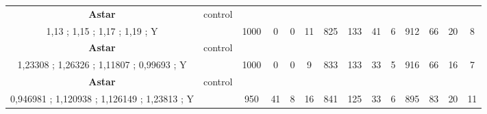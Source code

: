 \begin{table}[]
{\begin{tabular}{|c|c|c|c|c|c|c|c|c|c|c|c|c|c|}
\cellcolor{blue!15}\textbf{Astar} & control& {\color[HTML]{00009B} } & {\color[HTML]{9A0000} } & {\color[HTML]{009901} } &  & {\color[HTML]{00009B} } & {\color[HTML]{9A0000} } & {\color[HTML]{009901} } &  & {\color[HTML]{00009B} } & {\color[HTML]{9A0000} } & {\color[HTML]{009901} } &  \\ 
\cellcolor{ blue!15}1,13 ; 1,15 ; 1,17 ; 1,19 ; Y &  & \multirow{-2}{*}{{\color[HTML]{00009B} 1000}} & \multirow{-2}{*}{{\color[HTML]{9A0000} 0}} & \multirow{-2}{*}{{\color[HTML]{009901} 0}} & \multirow{-2}{*}{11} & \multirow{-2}{*}{{\color[HTML]{00009B} 825}} & \multirow{-2}{*}{{\color[HTML]{9A0000} 133}} & \multirow{-2}{*}{{\color[HTML]{009901} 41}} & \multirow{-2}{*}{6} & \multirow{-2}{*}{{\color[HTML]{00009B} 912}} & \multirow{-2}{*}{{\color[HTML]{9A0000} 66}} & \multirow{-2}{*}{{\color[HTML]{009901} 20}} & \multirow{-2}{*}{8} \\ \hline

\cellcolor{blue!15}\textbf{Astar} & control& {\color[HTML]{00009B} } & {\color[HTML]{9A0000} } & {\color[HTML]{009901} } &  & {\color[HTML]{00009B} } & {\color[HTML]{9A0000} } & {\color[HTML]{009901} } &  & {\color[HTML]{00009B} } & {\color[HTML]{9A0000} } & {\color[HTML]{009901} } &  \\ 
\cellcolor{ blue!15}1,23308 ; 1,26326 ; 1,11807 ; 0,99693 ; Y &  & \multirow{-2}{*}{{\color[HTML]{00009B} 1000}} & \multirow{-2}{*}{{\color[HTML]{9A0000} 0}} & \multirow{-2}{*}{{\color[HTML]{009901} 0}} & \multirow{-2}{*}{9} & \multirow{-2}{*}{{\color[HTML]{00009B} 833}} & \multirow{-2}{*}{{\color[HTML]{9A0000} 133}} & \multirow{-2}{*}{{\color[HTML]{009901} 33}} & \multirow{-2}{*}{5} & \multirow{-2}{*}{{\color[HTML]{00009B} 916}} & \multirow{-2}{*}{{\color[HTML]{9A0000} 66}} & \multirow{-2}{*}{{\color[HTML]{009901} 16}} & \multirow{-2}{*}{7} \\ \hline

\cellcolor{blue!15}\textbf{Astar} & control& {\color[HTML]{00009B} } & {\color[HTML]{9A0000} } & {\color[HTML]{009901} } &  & {\color[HTML]{00009B} } & {\color[HTML]{9A0000} } & {\color[HTML]{009901} } &  & {\color[HTML]{00009B} } & {\color[HTML]{9A0000} } & {\color[HTML]{009901} } &  \\ 
\cellcolor{ blue!15}0,946981 ; 1,120938 ; 1,126149 ; 1,23813 ; Y &  & \multirow{-2}{*}{{\color[HTML]{00009B} 950}} & \multirow{-2}{*}{{\color[HTML]{9A0000} 41}} & \multirow{-2}{*}{{\color[HTML]{009901} 8}} & \multirow{-2}{*}{16} & \multirow{-2}{*}{{\color[HTML]{00009B} 841}} & \multirow{-2}{*}{{\color[HTML]{9A0000} 125}} & \multirow{-2}{*}{{\color[HTML]{009901} 33}} & \multirow{-2}{*}{6} & \multirow{-2}{*}{{\color[HTML]{00009B} 895}} & \multirow{-2}{*}{{\color[HTML]{9A0000} 83}} & \multirow{-2}{*}{{\color[HTML]{009901} 20}} & \multirow{-2}{*}{11} \\ \hline


\end{tabular}}
\end{table}
